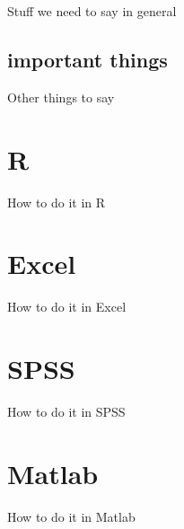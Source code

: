 \documentclass[]{book}
\theoremstyle{definition}
\theoremstyle{definition}
\theoremstyle{definition}
\theoremstyle{remark}
\begin{document}
Stuff we need to say in general

\subsection{important things}\label{important-things-6}

Other things to say

\section{R}\label{r-11}

How to do it in R

\section{Excel}\label{excel-10}

How to do it in Excel

\section{SPSS}\label{spss-10}

How to do it in SPSS

\section{Matlab}\label{matlab-10}

How to do it in Matlab


\end{document}
